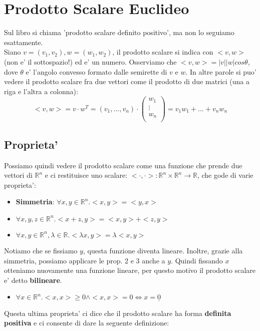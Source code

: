 \documentclass{report}
\begin{document}
\chapter{Prodotto Scalare Euclideo}
Sul libro si chiama 'prodotto scalare definito positivo', ma non lo seguiamo esattamente.\\
Siano $ v=(v_1,v_2), w=(w_1,w_2) $, il prodotto scalare si indica con $ <v,w> $ (non e' il sottospazio!) ed e' un numero. Osserviamo che $ <v,w> = |v||w|cos\theta $, dove $ \theta $ e' l'angolo convesso formato dalle semirette di $ v $ e $ w $.
In altre parole si puo' vedere il prodotto scalare fra due vettori come il prodotto di due matrici (una a riga e l'altra a colonna):
\[
  <v,w> = v\cdot w^T = (v_1,...,v_n)\cdot \begin{pmatrix}
  w_1\\
  \vdots\\
  w_n\\
  \end{pmatrix} = v_1w_1+...+v_nw_n
\]
\section{Proprieta'}
Possiamo quindi vedere il prodotto scalare come una funzione che prende due vettori di $ \mathbb{R}^n $ e ci restituisce uno scalare: $ <\cdot,\cdot>: \mathbb{R}^n \times \mathbb{R}^n \to \mathbb{R} $, che gode di varie proprieta':
\begin{itemize}
\item \textbf{Simmetria}: $ \forall x,y \in \mathbb{R}^n. <x,y> = <y,x> $
\item $ \forall x,y,z \in \mathbb{R}^n. <x+z, y> = <x,y>+<z,y> $
\item $ \forall x,y \in \mathbb{R}^n, \lambda \in \mathbb{R}. <\lambda x, y> = \lambda <x,y> $
\end{itemize}
Notiamo che se fissiamo $ y $, questa funzione diventa lineare. Inoltre, grazie alla simmetria, possiamo applicare le prop. 2 e 3 anche a $ y $. Quindi fissando $ x $ otteniamo nuovamente una funzione lineare, per questo motivo il prodotto scalare e' detto \textbf{bilineare}.
\begin{itemize}
\item $ \forall x \in \mathbb{R}^n. <x,x> \geq 0 \land <x,x> = 0 \iff x = \underline{0} $
\end{itemize}
Questa ultima proprieta' ci dice che il prodotto scalare ha forma \textbf{definita positiva} e ci consente di dare la seguente definizione:
\end{document}
